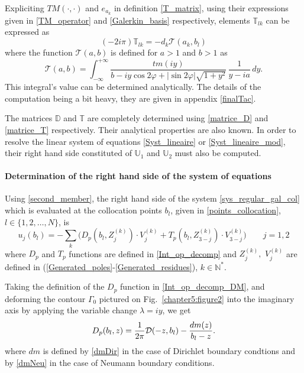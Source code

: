 Expliciting $TM(\cdot,\cdot)$ and $e_{a_k}$ in definition \eqref{T_matrix}, using their expressions given in \eqref{TM_operator} and \eqref{Galerkin_basis} respectively, elements $\mathbb{T}_{lk}$ can be expressed as
\begin{equation}
\label{matrice_T}
(-2i\pi) \mathbb{T}_{lk} =  - d_k \mathcal{T}(a_k,b_l)
\end{equation}
where the function $\mathcal{T}(a,b)$ is defined for $a>1$ and $b>1$ as
\begin{equation}
\label{ltbis}
\mathcal{T}(a,b) = \int_{-\infty}^{+\infty} \dfrac{tm(iy)}{ b - iy \cos 2\varphi  + |\sin 2\varphi| \sqrt{1+y^2}} \, \dfrac{1}{y -i a} \, dy . 
\end{equation}
This integral's value can be determined analytically. The details of the computation being a bit heavy, they are given in appendix \ref{finalTac}.

The matrices $\mathbb{D}$ and $\mathbb{T}$ are completely determined using \eqref{matrice_D} and \eqref{matrice_T} respectively. Their analytical properties are also known. In order to resolve the linear system of equations \eqref{Syst_lineaire} or \eqref{Syst_lineaire_mod},  their right hand side constituted of $\mathbb{U}_1$ and $\mathbb{U}_2$ must also be computed.

\paragraph{Determination of the right hand side of the system of equations}

Using \eqref{second_member}, the right hand side of the system \eqref{sys_regular_gal_col} which is evaluated at the collocation points $b_l$, given in \eqref{points_collocation}, $l \in \{ 1,2, \ldots, N \}$, is 
\begin{equation}
\label{second_member_new}
u_j(b_l) = -\sum_k \Big( D_p(b_l,Z_j^{(k)})\cdot V_j^{(k)}+ T_p(b_l,Z_{3-j}^{(k)})\cdot V_{3-j}^{(k)}\Big) \qquad j=1,2
\end{equation}
where $D_p$ and $T_p$ functions are defined in \eqref{Int_op_decomp} and $Z_j^{(k)},\, \, V_j^{(k)}$ are defined in (\ref{Generated_poles}-\ref{Generated_residues}), $k \in \mathbb{N}^*$. 

Taking the definition of the $D_p$ function in \eqref{Int_op_decomp_DM}, and deforming the contour $\Gamma_0$ pictured on Fig.~\ref{chapter5:figure2} into the imaginary axis by applying the variable change $\lambda = iy$, we get
\begin{equation}
\label{Dp_final}
D_p(b_l,z) = {1\over 2\pi}\mathcal D(-z,b_l)-  {dm(z)\over b_l-z}.
\end{equation}
where $dm$ is defined by \eqref{dmDir} in the case of Dirichlet boundary condtions and by \eqref{dmNeu} in the case of Neumann boundary conditions.

